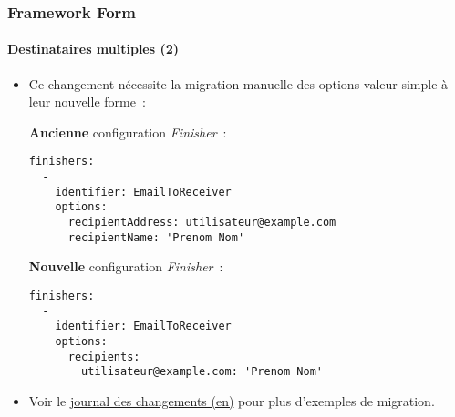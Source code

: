 
\begin{frame}[fragile]
\frametitle{Framework Form}
\framesubtitle{Destinataires multiples (2)}

	\lstset{basicstyle=\tiny\ttfamily}

	\begin{itemize}
		\item Ce changement nécessite la migration manuelle des options valeur simple à leur nouvelle forme~:

		\smaller\textbf{Ancienne} configuration \textit{Finisher}~:\normalsize

\begin{lstlisting}
finishers:
  -
    identifier: EmailToReceiver
    options:
      recipientAddress: utilisateur@example.com
      recipientName: 'Prenom Nom'
\end{lstlisting}

		\smaller\textbf{Nouvelle} configuration \textit{Finisher}~:\normalsize

\begin{lstlisting}
finishers:
  -
    identifier: EmailToReceiver
    options:
      recipients:
        utilisateur@example.com: 'Prenom Nom'
\end{lstlisting}

		\item Voir le \href{https://docs.typo3.org/c/typo3/cms-core/10.0/en-us/Changelog/master/Deprecation-80420-EmailFinisherSingleAddressOptions.html}{journal des changements (en)}
			pour plus d'exemples de migration.

	\end{itemize}

\end{frame}


